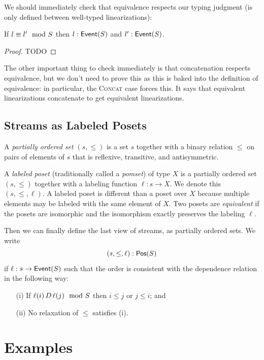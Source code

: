 We should immediately check that equivalence respects our typing judgment (is only defined between well-typed linearizations):
\begin{proposition}
\label{prop:equiv-preserves-typing}
If $l \equiv l' \mod {S}$ then $l: \mathsf{Event}({S})$ and $l': \mathsf{Event}({S})$.
\end{proposition}
\begin{proof}
  TODO
\end{proof}

The other important thing to check immediately is that concatenation respects equivalence, but we don't need to prove this as this is baked into the definition of equivalence: in particular, the \textsc{Concat} case forces this. It says that equivalent linearizations concatenate to get equivalent linearizations.

\subsection{Streams as Labeled Posets}
\label{view:labeled-posets}

A \emph{partially ordered set} $(s, \le)$ is a set $s$ together with a binary relation $\le$ on pairs of elements of $s$ that is reflexive, transitive, and antisymmetric.

A \emph{labeled poset} (traditionally called a \emph{pomset}) of type $X$ is a
partially ordered set $(s, \le)$ together with a labeling function $\ell: s \to X$. We denote this $(s, \le, \ell)$. A labeled poset is different than a poset over $X$ because multiple elements may be labeled with the same element of $X$.
Two posets are \emph{equivalent} if the posets are isomorphic and the isomorphism exactly preserves the labeling $\ell$.

Then we can finally define the last view of streams, as partially ordered sets.
We write
\[
(s, \le, \ell): \mathsf{Pos}({S})
\]
if $\ell: s \to \mathsf{Event}(S)$ such that the order is consistent with the dependence
relation in the following way:
\begin{enumerate}
\item[(i)] If $\ell(i) \,D\, \ell(j) \mod {S}$ then $i \le j$ or $j \le i$; and
\item[(ii)] No relaxation of $\le$ satisfies (i).
\end{enumerate}

\section{Examples}

